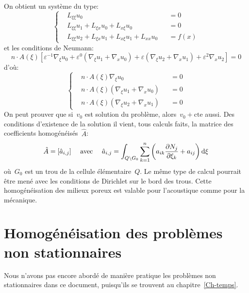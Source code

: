 On obtient un système du type:
\begin{equation}\left\{
\begin{aligned}
&L_{\xi\xi} u_0 &&=0\\
&L_{\xi\xi}u_1+L_{\xi x}u_0+L_{x\xi}u_0 &&=0\\
&L_{\xi\xi}u_2+L_{\xi x}u_1+L_{x\xi}u_1 +L_{xx}u_0 &&=f(x)
\end{aligned}
\right. \end{equation}
et les conditions de Neumann:
\begin{equation} n\cdot A(\xi)\left[ \varepsilon^{-1}\nabla_\xi u_0 + \varepsilon^0 (\nabla_\xi u_1+\nabla_x u_0) +
\varepsilon(\nabla_\xi u_2+\nabla_x u_1)+\varepsilon^2\nabla_x u_2
\right]=0 \end{equation}
d'où:
\begin{equation}\left\{
\begin{aligned}
&n\cdot A(\xi)\nabla_\xi u_0 &&=0\\
&n\cdot A(\xi) (\nabla_\xi u_1+\nabla_x u_0) &&=0\\
&n\cdot A(\xi)(\nabla_\xi u_2+\nabla_x u_1) &&=0
\end{aligned}
\right. \end{equation}
On peut prouver que si~$v_0$ est solution du problème, alors~$v_0+\text{cte}$ aussi.
\medskipvm
Des conditions d'existence de la solution il vient, tous calculs faits, la matrice des
coefficients homogénéisés~$\hat{A}$:
\begin{equation} \hat{A} = [\hat{a}_{i,j} ]
\quad \text{ avec }
\quad
\hat{a}_{i,j}=\displaystyle\int_{Q\backslash G_0} \displaystyle\sum_{k=1}^n \left(a_{ik} \frac{\partial N_j}{\partial\xi_k} + a_{ij}
\right) \text{d}\xi
\end{equation}
où~$G_0$ est un trou de la cellule élémentaire~$Q$.
\medskipvm
Le même type de calcul pourrait être mené avec les conditions de Dirichlet sur le bord des trous.
\medskipvm
Cette homogénéisation des milieux poreux est valable pour l'acoustique comme pour la mécanique.

\medskip
\section{Homogénéisation des problèmes non stationnaires}

Nous n'avons pas encore abordé de manière pratique les problèmes non stationnaires dans ce document, puisqu'ils se trouvent au chapitre~\ref{Ch-temps}.

